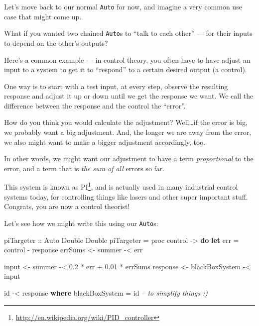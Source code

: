 \documentclass[]{article}
\newenvironment{Shaded}{}{}
\newcommand{\KeywordTok}[1]{\textcolor[rgb]{0.00,0.44,0.13}{\textbf{{#1}}}}
\newcommand{\DataTypeTok}[1]{\textcolor[rgb]{0.56,0.13,0.00}{{#1}}}
\newcommand{\FloatTok}[1]{\textcolor[rgb]{0.25,0.63,0.44}{{#1}}}
\newcommand{\CommentTok}[1]{\textcolor[rgb]{0.38,0.63,0.69}{\textit{{#1}}}}
\newcommand{\OtherTok}[1]{\textcolor[rgb]{0.00,0.44,0.13}{{#1}}}
\newcommand{\FunctionTok}[1]{\textcolor[rgb]{0.02,0.16,0.49}{{#1}}}
\newcommand{\NormalTok}[1]{{#1}}
\renewcommand{\href}[2]{#2\footnote{\url{#1}}}
\begin{document}
Let's move back to our normal \texttt{Auto} for now, and imagine a very
common use case that might come up.

What if you wanted two chained \texttt{Auto}s to ``talk to each other''
--- for their inputs to depend on the other's outputs?

Here's a common example --- in control theory, you often have to have
adjust an input to a system to get it to ``respond'' to a certain
desired output (a control).

One way is to start with a test input, at every step, observe the
resulting response and adjust it up or down until we get the response we
want. We call the difference between the response and the control the
``error''.

How do you think you would calculate the adjustment? Well\ldots{}if the
error is big, we probably want a big adjustment. And, the longer we are
away from the error, we also might want to make a bigger adjustment
accordingly, too.

In other words, we might want our adjustment to have a term
\emph{proportional} to the error, and a term that is \emph{the sum of
all} errors so far.

This system is known as
\href{http://en.wikipedia.org/wiki/PID_controller}{PI}, and is actually
used in many industrial control systems today, for controlling things
like lasers and other super important stuff. Congrats, you are now a
control theorist!

Let's see how we might write this using our \texttt{Auto}s:

\begin{Shaded}
\begin{Highlighting}[]
\OtherTok{piTargeter ::} \DataTypeTok{Auto} \DataTypeTok{Double} \DataTypeTok{Double}
\NormalTok{piTargeter }\FunctionTok{=} \NormalTok{proc control }\OtherTok{->} \KeywordTok{do}
    \KeywordTok{let} \NormalTok{err }\FunctionTok{=} \NormalTok{control }\FunctionTok{-} \NormalTok{response}
    \NormalTok{errSums  }\OtherTok{<-} \NormalTok{summer         }\FunctionTok{-<} \NormalTok{err}

    \NormalTok{input    }\OtherTok{<-} \NormalTok{summer         }\FunctionTok{-<} \FloatTok{0.2} \FunctionTok{*} \NormalTok{err }\FunctionTok{+} \FloatTok{0.01} \FunctionTok{*} \NormalTok{errSums}
    \NormalTok{response }\OtherTok{<-} \NormalTok{blackBoxSystem }\FunctionTok{-<} \NormalTok{input}

    \NormalTok{id }\FunctionTok{-<} \NormalTok{response}
  \KeywordTok{where}
    \NormalTok{blackBoxSystem }\FunctionTok{=} \NormalTok{id     }\CommentTok{-- to simplify things :)}
\end{Highlighting}
\end{Shaded}
\end{document}
